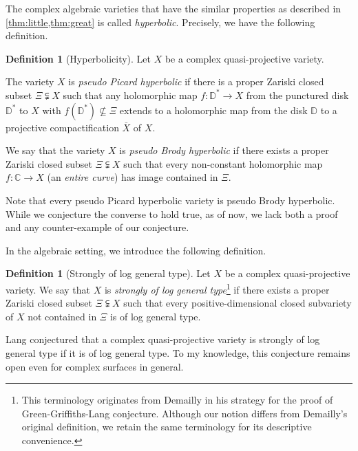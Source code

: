 \documentclass[english]{amsproc}
\theoremstyle{plain}
\theoremstyle{definition}
\newtheorem{dfn}[thm]{Definition}
\theoremstyle{remark}
\theoremstyle{plain}
\numberwithin{equation}{thm} %
\newcommand{\bD}{\mathbb{D}}
\begin{document}
The complex algebraic varieties that have the similar  properties as described in  \cref{thm:little,thm:great} is called \emph{hyperbolic}. Precisely, we have the following definition.
\begin{dfn}[Hyperbolicity]
	Let $X$ be a complex quasi-projective variety.  
	\begin{thmlist}
		\item The variety $X$ is \emph{pseudo Picard hyperbolic} if  there is a proper Zariski closed subset $\Xi\subsetneqq X$  such that  any holomorphic map $f:\bD^*\to X$ from the punctured disk $\bD^*$ to $X$ with $f(\bD^*)\not\subseteq \Xi$ extends to  a holomorphic map from the disk $\bD$ to a projective compactification $\overline{X}$ of $X$.
		\item  We say that the variety $X$ is \emph{pseudo Brody hyperbolic} if there exists a proper Zariski closed subset $\Xi \subsetneqq X$ such that every non-constant holomorphic map $f : \mathbb{C} \to X$ (an \emph{entire curve}) has image contained in $\Xi$. 
	\end{thmlist}
\end{dfn}
Note that every pseudo Picard hyperbolic variety is pseudo Brody hyperbolic. While we conjecture the converse to hold true, as of now, we lack both a proof and any counter-example of our conjecture.

In the algebraic setting, we introduce the following definition.
\begin{dfn}[Strongly of log general type]
	Let $X$ be a complex quasi-projective variety. We say that $X$ is \emph{strongly of log general type}\footnote{This terminology originates from Demailly \cite{Dem15} in his strategy
		for the proof of Green-Griffiths-Lang conjecture. 
		Although our notion differs from Demailly’s original definition,
		we retain the same terminology for its descriptive convenience.}
	 if there exists a proper Zariski closed subset $\Xi\subsetneqq X$ such that every positive-dimensional closed subvariety of $X$ not contained in $\Xi$ is of log general type.
\end{dfn} 
Lang conjectured that a complex quasi-projective variety is strongly of log general type if it is of log general type. To my knowledge, this conjecture remains open  even for complex surfaces in general.
\end{document}
